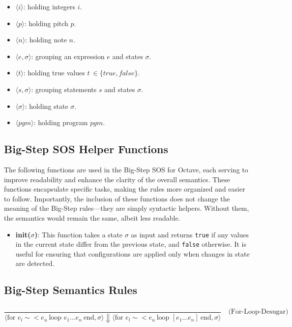 \documentclass[letterpaper,12pt]{article}
\begin{document}
\begin{itemize}    
    \item $\langle i \rangle$: holding integers $i$.
    
    \item $\langle p \rangle$: holding pitch $p$.

    \item $\langle n \rangle$: holding note $n$. 

    \item $\langle e, \sigma \rangle$: grouping an expression $e$ and states $\sigma$. 

    \item $\langle t \rangle$: holding true values $t\ \in \{true, false\}$.
    
    \item $\langle s, \sigma \rangle$: grouping statements $s$ and states $\sigma$. 
        
    \item $\langle \sigma \rangle$: holding state $\sigma$.

    \item $\langle pgm \rangle$: holding program $pgm$.
    
\end{itemize}

\subsection{Big-Step SOS Helper Functions}

The following functions are used in the Big-Step SOS for Octave, each serving to improve readability and enhance the clarity of the overall semantics. These functions encapsulate specific tasks, making the rules more organized and easier to follow. Importantly, the inclusion of these functions does not change the meaning of the Big-Step rules—they are simply syntactic helpers. Without them, the semantics would remain the same, albeit less readable.
\begin{itemize}
    \item \textbf{init($\sigma$)}: This function takes a state $\sigma$ as input and returns \texttt{true} if any values in the current state differ from the previous state, and \texttt{false} otherwise. It is useful for ensuring that configurations are applied only when changes in state are detected.
\end{itemize}

\subsection{Big-Step Semantics Rules}
    \[
        \frac{
            \begin{array}{c}
            \end{array}
        }{
            \langle \text{for } e_l \sim< e_u \ \text{loop } e_1 \dots e_n \ \text{end}, \sigma \rangle \Downarrow 
            \langle \text{for } e_l \sim< e_u \ \text{loop } [e_1 \dots e_n] \ \text{end}, \sigma \rangle
        }
        \quad \text{(For-Loop-Desugar)}
    \]
\end{document}
